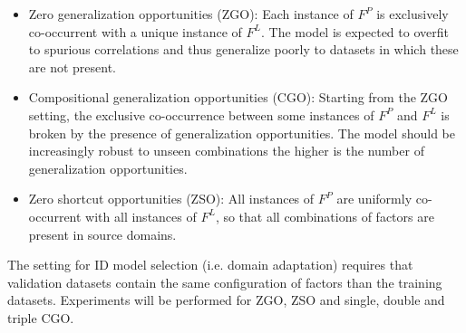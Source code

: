     \begin{itemize}
        \item Zero generalization opportunities (ZGO): Each instance of $F^P$ is exclusively co-occurrent with a 
        unique instance of $F^L$. The model is expected to overfit to spurious correlations and thus generalize
        poorly to datasets in which these are not present.
        \item Compositional generalization opportunities (CGO): Starting from the ZGO setting, the exclusive co-occurrence
        between some instances of $F^P$ and $F^L$ is broken by the presence of generalization opportunities. The model 
        should be increasingly robust to unseen combinations the higher is the number of generalization opportunities.
        \item Zero shortcut opportunities (ZSO): All instances of $F^P$ are uniformly co-occurrent with all 
        instances of $F^L$, so that all combinations of factors are present in source domains.
    \end{itemize}

    The setting for ID model selection (i.e. domain adaptation) requires that validation datasets contain the
    same configuration of factors than the training datasets. Experiments will be performed for
    ZGO, ZSO and single, double and triple CGO.

